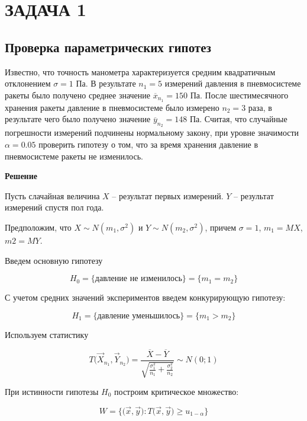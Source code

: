 \section{ЗАДАЧА 1}

\subsection{Проверка параметрических гипотез}

Известно, что точность манометра характеризуется средним квадратичным отклонением $\sigma = 1$ Па. В результате $n_1 = 5$ измерений давления в пневмосистеме ракеты было получено среднее значение $\overline{x}_{n_1} = 150$ Па. После шестимесячного хранения ракеты давление в пневмосистеме было измерено $n_2 = 3$ раза, в результате чего было получено значение $\overline{y}_{n_2} = 148$ Па. Считая, что случайные погрешности измерений подчинены нормальному закону, при уровне значимости $\alpha = 0.05$ проверить гипотезу о том, что за время хранения давление в пневмосистеме ракеты не изменилось.

\textbf{Решение}

Пусть слачайная величина  $X$ -- результат первых измерений. $Y$ -- результат измерений спустя пол года.

Предположим, что $X \sim N(m_1, \sigma^2)$ и $Y \sim N(m_2, \sigma^2)$, причем $\sigma = 1$, $m_1 = MX$, $m2 = MY$.

Введем основную гипотезу

\begin{equation*}
    H_0 = \{ \text{давление не изменилось} \} = \{m_1 = m_2\}
\end{equation*}

С учетом средних значений экспериментов введем конкурирующую гипотезу:

\begin{equation*}
    H_1 = \{ \text{давление уменьшилось} \} = \{ m_1 > m_2 \}
\end{equation*}

Используем статистику

\begin{equation*}
    T \big( \vec X_{n_1}, \vec Y_{n_2} \big) = \frac{\overline X - \overline Y}{\sqrt{\frac{\sigma_1^2}{n_1}+\frac{\sigma_2^2}{n_2}}} \sim N(0;1)
\end{equation*}

При истинности гипотезы $H_0$ построим критическое множество:

\begin{equation*}
    W = \big\{ \big( \vec x, \vec y \big) : T \big(\vec x, \vec y \big) \geq u_{1 - \alpha}\big\}
\end{equation*}

